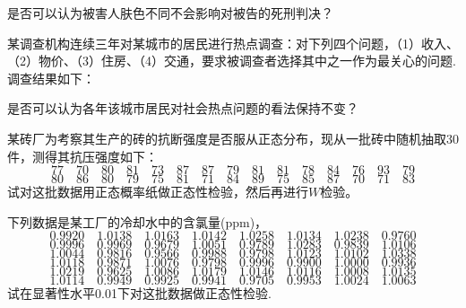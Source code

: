 \begin{xiti}
是否可以认为被害人肤色不同不会影响对被告的死刑判决？

\item 某调查机构连续三年对某城市的居民进行热点调查：对下列四个问题，（1）收入、（2）物价、（3）住房、（4）交通，要求被调查者选择其中之一作为最关心的问题.调查结果如下：

是否可以认为各年该城市居民对社会热点问题的看法保持不变？

\item 某砖厂为考察其生产的砖的抗断强度是否服从正态分布，现从一批砖中随机抽取30件，测得其抗压强度如下：
\[77 \quad 70 \quad 80 \quad 81 \quad 73 \quad 87 \quad 87 \quad 79 \quad 81 \quad 81 \quad78 \quad 84 \quad 76 \quad 93 \quad 79\]
\[80 \quad 86 \quad 80 \quad 79 \quad 75 \quad 81 \quad 71 \quad 84 \quad 89 \quad 75 \quad 85 \quad 87 \quad 70 \quad 71 \quad 83\]
试对这批数据用正态概率纸做正态性检验，然后再进行$W$检验。

\item 下列数据是某工厂的冷却水中的含氯量(ppm)，
\[
0.9920\quad 1.0138\quad 1.0163\quad 1.0142\quad 1.0258\quad 1.0134\quad 1.0238\quad 0.9760
\]
\[
0.9996\quad 0.9969\quad 0.9679\quad 1.0051\quad 0.9789\quad 1.0283\quad 0.9839\quad 1.0106
\]
\[
1.0044\quad 0.9816\quad 0.9566\quad 0.9988\quad 0.9798\quad 1.0123\quad 1.0102\quad 1.0338
\]
\[
1.0118\quad 0.9871\quad 1.0076\quad 0.9798\quad 0.9996\quad 0.9900\quad 1.0000\quad 0.9936
\]
\[
1.0219\quad 0.9625\quad 1.0086\quad 1.0179\quad 1.0146\quad 1.0116\quad 1.0008\quad 1.0135
\]
\[
1.0114\quad 0.9949\quad 0.9925\quad 0.9941\quad 0.9705\quad 0.9953\quad 1.0024\quad 1.0063
\]
试在显著性水平0.01下对这批数据做正态性检验.
\end{xiti}
